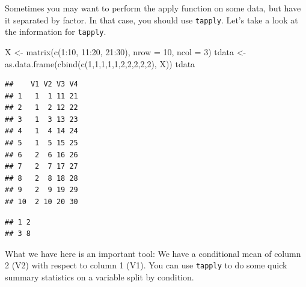 \documentclass[
]{book}
\newenvironment{Shaded}{\begin{snugshade}}{\end{snugshade}}
\newcommand{\AttributeTok}[1]{\textcolor[rgb]{0.77,0.63,0.00}{#1}}
\newcommand{\ControlFlowTok}[1]{\textcolor[rgb]{0.13,0.29,0.53}{\textbf{#1}}}
\newcommand{\DecValTok}[1]{\textcolor[rgb]{0.00,0.00,0.81}{#1}}
\newcommand{\FunctionTok}[1]{\textcolor[rgb]{0.00,0.00,0.00}{#1}}
\newcommand{\NormalTok}[1]{#1}
\newcommand{\OtherTok}[1]{\textcolor[rgb]{0.56,0.35,0.01}{#1}}
\newcommand{\SpecialCharTok}[1]{\textcolor[rgb]{0.00,0.00,0.00}{#1}}
\theoremstyle{definition}
\theoremstyle{definition}
\theoremstyle{definition}
\theoremstyle{definition}
\theoremstyle{remark}
\begin{document}
Sometimes you may want to perform the apply function on some data, but have it separated by factor. In that case, you should use \texttt{tapply}. Let's take a look at the information for \texttt{tapply}.

\begin{Shaded}
\begin{Highlighting}[]
\NormalTok{X }\OtherTok{\textless{}{-}} \FunctionTok{matrix}\NormalTok{(}\FunctionTok{c}\NormalTok{(}\DecValTok{1}\SpecialCharTok{:}\DecValTok{10}\NormalTok{, }\DecValTok{11}\SpecialCharTok{:}\DecValTok{20}\NormalTok{, }\DecValTok{21}\SpecialCharTok{:}\DecValTok{30}\NormalTok{), }\AttributeTok{nrow =} \DecValTok{10}\NormalTok{, }\AttributeTok{ncol =} \DecValTok{3}\NormalTok{)}
\NormalTok{tdata }\OtherTok{\textless{}{-}} \FunctionTok{as.data.frame}\NormalTok{(}\FunctionTok{cbind}\NormalTok{(}\FunctionTok{c}\NormalTok{(}\DecValTok{1}\NormalTok{,}\DecValTok{1}\NormalTok{,}\DecValTok{1}\NormalTok{,}\DecValTok{1}\NormalTok{,}\DecValTok{1}\NormalTok{,}\DecValTok{2}\NormalTok{,}\DecValTok{2}\NormalTok{,}\DecValTok{2}\NormalTok{,}\DecValTok{2}\NormalTok{,}\DecValTok{2}\NormalTok{), X))}
\NormalTok{tdata}
\end{Highlighting}
\end{Shaded}

\begin{verbatim}
##    V1 V2 V3 V4
## 1   1  1 11 21
## 2   1  2 12 22
## 3   1  3 13 23
## 4   1  4 14 24
## 5   1  5 15 25
## 6   2  6 16 26
## 7   2  7 17 27
## 8   2  8 18 28
## 9   2  9 19 29
## 10  2 10 20 30
\end{verbatim}

\begin{Shaded}
\end{Shaded}

\begin{verbatim}
## 1 2 
## 3 8
\end{verbatim}

What we have here is an important tool: We have a conditional mean of column 2 (V2) with respect to column 1 (V1). You can use \texttt{tapply} to do some quick summary statistics on a variable split by condition.

\begin{Shaded}
\end{Shaded}
\end{document}
